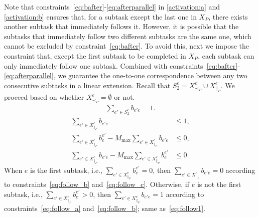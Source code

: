 \documentclass[Afour,sageh,times]{sagej}
\newcounter{phase} \setcounter{phase}{0}
\newcounter{subphase}[phase] \setcounter{subphase}{0}
\begin{document}
{{{{{Note that constraints~\eqref{eq:bafter}-\eqref{eq:afterparallel} in \ref{activation:a} and \ref{activation:b} ensures that, for a subtask except the last one in $X_P$, there exists another subtask that immediately follows it. However, it is possible that the subtasks that immediately follow two different subtasks are the same one, which cannot be excluded by constraint~\eqref{eq:bafter}. To avoid this, next we impose the constraint that, except the first subtask  to be completed in $X_P$, each subtask  can only immediately follow one subtask. Combined with constraints~\eqref{eq:bafter}-\eqref{eq:afterparallel}, we guarantee the one-to-one correspondence between any two consecutive subtasks in a linear extension. Recall that $S_2^e = X^e_{\prec_{P}} \cup X^e_{\|_{P}}$. We proceed based on whether $X^e_{\prec_{P}} = \emptyset$ or not.
  \begin{align}\label{eq:follow1}
 \sum_{e' \in S_2^e} b_{e'e} = 1.
\end{align}
\begin{subequations}\label{eq:follow}
  \begin{align}
  \sum_{e' \in X_{\|_P}^e} b_{e'e} & \le 1,\label{eq:follow_a}\\
 \sum_{e' \in X^e_{\|_{P}}  } b_{e}^{e'} - M_{\text{max}}  \sum_{e' \in X_{\|_P}^e} b_{e'e} &  \leq 0, \label{eq:follow_b} \\
  \sum_{e' \in X_{\|_P}^e} b_{e'e} - M_{\text{max}} \sum_{e' \in X^e_{\|_{P}}  } b_{e}^{e'} & \leq0 . \label{eq:follow_c}
\end{align}
\end{subequations}
When $e$ is the first subtask, i.e., $\sum_{e' \in X^e_{\|_{P}}  } b_{e}^{e'}=0$, then $\sum_{e' \in X_{\|_P}^e} b_{e'e} = 0$ according to constraints~\eqref{eq:follow_b} and~\eqref{eq:follow_c}. Otherwise, if $e$ is not the first subtask, i.e., $\sum_{e' \in X^e_{\|_{P}}  } b_{e}^{e'} > 0$, then $\sum_{e' \in X_{\|_P}^e} b_{e'e} = 1$ according to constraints~\eqref{eq:follow_a} and~\eqref{eq:follow_b}; same as~\eqref{eq:follow1}.


}}}}}
\end{document}
